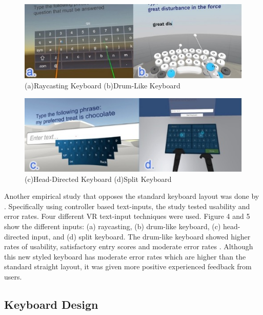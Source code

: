 \documentclass{vgtc}                          %
\begin{document}
\begin{figure}[h!]
 \centering %
 \includegraphics[width=\columnwidth]{ab.jpg}
 \caption{(a)Raycasting Keyboard (b)Drum-Like Keyboard}
 \label{fig:ab}
\end{figure}
\begin{figure}[h!]
 \centering %
 \includegraphics[width=\columnwidth]{bc.jpg}
 \caption{(c)Head-Directed Keyboard (d)Split Keyboard}
 \label{fig:cd}
\end{figure}

Another empirical study that opposes the standard keyboard layout was done by \cite{23}. Specifically using controller based text-inputs, the study tested usability and error rates. Four different VR text-input techniques were used. Figure 4 and 5 show the different inputs: (a) raycasting, (b) drum-like keyboard, (c) head-directed input, and (d) split keyboard. The drum-like keyboard showed higher rates of usability, satisfactory entry scores and moderate error rates \cite{23}. Although this new styled keyboard has moderate error rates which are higher than the standard straight layout, it was given more positive experienced feedback from users\cite{23}.

\subsection{Keyboard Design}
\end{document}
